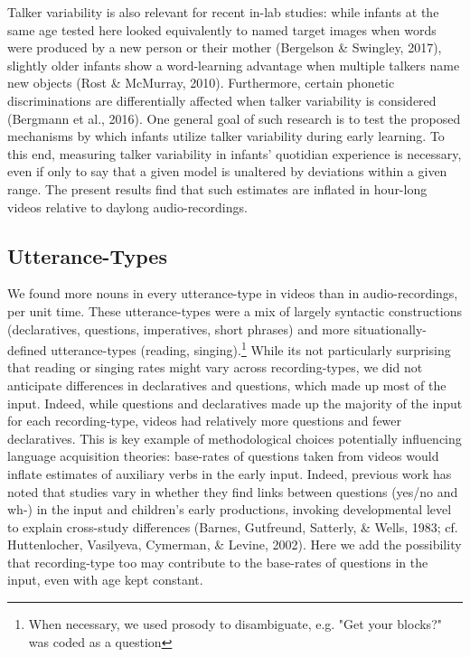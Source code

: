 \documentclass[man]{apa6}
\theoremstyle{definition}
\theoremstyle{definition}
\theoremstyle{definition}
\theoremstyle{remark}
\begin{document}
Talker variability is also relevant for recent in-lab studies: while
infants at the same age tested here looked equivalently to named target
images when words were produced by a new person or their mother
(Bergelson \& Swingley, 2017), slightly older infants show a
word-learning advantage when multiple talkers name new objects (Rost \&
McMurray, 2010). Furthermore, certain phonetic discriminations are
differentially affected when talker variability is considered (Bergmann
et al., 2016). One general goal of such research is to test the proposed
mechanisms by which infants utilize talker variability during early
learning. To this end, measuring talker variability in infants'
quotidian experience is necessary, even if only to say that a given
model is unaltered by deviations within a given range. The present
results find that such estimates are inflated in hour-long videos
relative to daylong audio-recordings.

\subsection{Utterance-Types}\label{utterance-types}

We found more nouns in every utterance-type in videos than in
audio-recordings, per unit time. These utterance-types were a mix of
largely syntactic constructions (declaratives, questions, imperatives,
short phrases) and more situationally-defined utterance-types (reading,
singing).\footnote{When necessary, we used prosody to disambiguate, e.g. "Get your blocks?" was coded as a question}
While its not particularly surprising that reading or singing rates
might vary across recording-types, we did not anticipate differences in
declaratives and questions, which made up most of the input. Indeed,
while questions and declaratives made up the majority of the input for
each recording-type, videos had relatively more questions and fewer
declaratives. This is key example of methodological choices potentially
influencing language acquisition theories: base-rates of questions taken
from videos would inflate estimates of auxiliary verbs in the early
input. Indeed, previous work has noted that studies vary in whether they
find links between questions (yes/no and wh-) in the input and
children's early productions, invoking developmental level to explain
cross-study differences (Barnes, Gutfreund, Satterly, \& Wells, 1983;
cf. Huttenlocher, Vasilyeva, Cymerman, \& Levine, 2002). Here we add the
possibility that recording-type too may contribute to the base-rates of
questions in the input, even with age kept constant.
\end{document}
